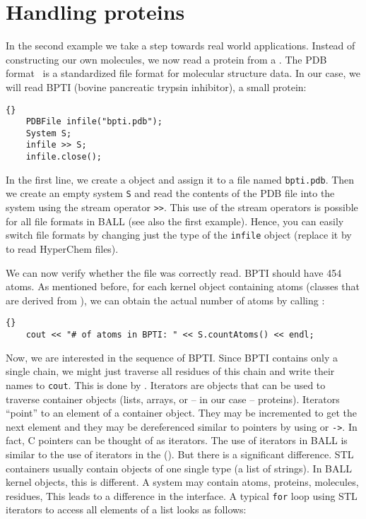 \section{Handling proteins}

In the second example we take a step towards real world applications. Instead
of constructing our own molecules, we now read a protein from a . The PDB format~\cite{PDB} is a standardized file format for molecular structure
data. In our case, we will read BPTI (bovine pancreatic trypsin inhibitor), a
small protein:

\begin{lstlisting}{}
	PDBFile infile("bpti.pdb");
	System S;
	infile >> S;
	infile.close();
\end{lstlisting}

\noindent
In the first line, we create a  object and assign it to a file
named {\tt bpti.pdb}. Then we create an empty system {\tt S} and read the
contents of the PDB file into the system using the stream operator {\tt >>}.
This use of the stream operators is possible for all file formats in BALL (see
also the first example). Hence, you can easily switch file formats
by changing just the type of the {\tt infile} object (\eg replace it by
 to read HyperChem files).

We can now verify whether the file was correctly read. BPTI should have 454
atoms. As mentioned before, for each kernel object containing atoms
(\ie classes that are derived from ), we can obtain the
actual number of atoms by calling :

\begin{lstlisting}{}
	cout << "# of atoms in BPTI: " << S.countAtoms() << endl;
\end{lstlisting}

Now, we are interested in the sequence of BPTI. Since BPTI contains only a
single chain, we might just traverse all residues of this chain and write
their names to {\tt cout}. This is done by . Iterators are
objects that can be used to traverse container objects (\eg lists, arrays, or
-- in our case -- proteins). Iterators ``point'' to an element of a container
object. They may be incremented to get the next element and they may be
dereferenced similar to pointers by using {\tt *} or {\tt ->}. In fact,
C pointers can be thought of as iterators.
The use of iterators in BALL is similar to the
use of iterators in the  ().
But there is a significant difference. STL containers usually contain objects of
one single type (\eg a list of strings). In BALL kernel objects, this is
different. A system may contain atoms, proteins, molecules, residues, \etc
This leads to a difference in the interface. A typical {\tt for} loop using STL
iterators to access all elements of a list looks as follows:


